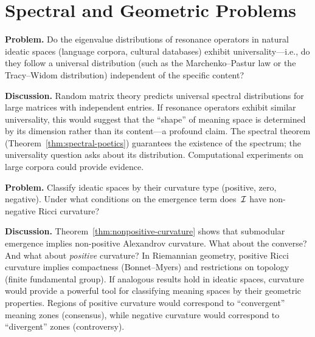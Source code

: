 \section{Spectral and Geometric Problems}
\label{sec:open-spectral}

\begin{game}
\label{op:spectral-universality}
\textbf{Problem.}  Do the eigenvalue distributions of resonance
operators in natural ideatic spaces (language corpora, cultural
databases) exhibit universality---i.e., do they follow a universal
distribution (such as the Marchenko--Pastur law or the Tracy--Widom
distribution) independent of the specific content?

\textbf{Discussion.}  Random matrix theory predicts universal spectral
distributions for large matrices with independent entries.  If
resonance operators exhibit similar universality, this would suggest
that the ``shape'' of meaning space is determined by its dimension
rather than its content---a profound claim.  The spectral theorem
(Theorem~\ref{thm:spectral-poetics}) guarantees the existence of the
spectrum; the universality question asks about its distribution.
Computational experiments on large corpora could provide evidence.
\end{game}

\begin{game}
\label{op:curvature}
\textbf{Problem.}  Classify ideatic spaces by their curvature type
(positive, zero, negative).  Under what conditions on the emergence
term does~$\mathcal{I}$ have non-negative Ricci curvature?

\textbf{Discussion.}  Theorem~\ref{thm:nonpositive-curvature} shows
that submodular emergence implies non-positive Alexandrov curvature.
What about the converse?  And what about \emph{positive} curvature?
In Riemannian geometry, positive Ricci curvature implies compactness
(Bonnet--Myers) and restrictions on topology (finite fundamental group).
If analogous results hold in ideatic spaces, curvature would provide a
powerful tool for classifying meaning spaces by their geometric
properties.  Regions of positive curvature would correspond to
``convergent'' meaning zones (consensus), while negative curvature
would correspond to ``divergent'' zones (controversy).
\end{game}

